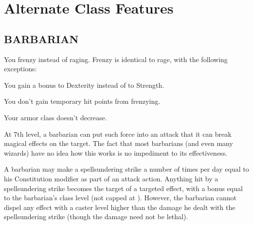 \chapter{Alternate Class Features}

\section*{BARBARIAN}
 You frenzy instead of raging. Frenzy is identical to rage, with the following exceptions:
\begin{itemize*}
\item You gain a bonus to Dexterity instead of to Strength.
\item You don't gain temporary hit points from frenzying.
\item Your armor class doesn't decrease.
\end{itemize*}

 At 7th level, a barbarian can put such force into an attack that it can break magical effects on the target. The fact that most barbarians (and even many wizards) have no idea how this works is no impediment to its effectiveness.
\par A barbarian may make a spellsundering strike a number of times per day equal to his Constitution modifier as part of an attack action. Anything hit by a spellsundering strike becomes the target of a targeted  effect, with a bonus equal to the barbarian's class level (not capped at ). However, the barbarian cannot dispel any effect with a caster level higher than the damage he dealt with the spellsundering strike (though the damage need not be lethal).